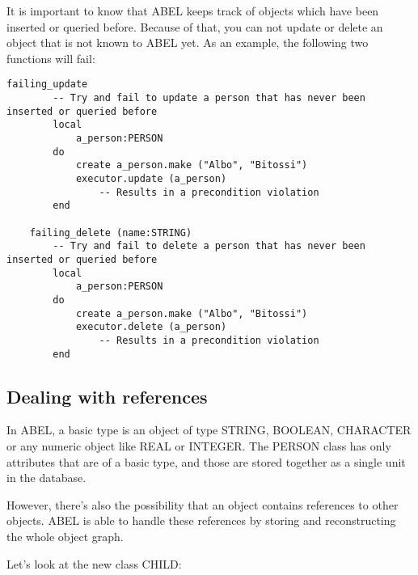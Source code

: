It is important to know that ABEL keeps track of objects which have been inserted or queried before.
Because of that, you can not update or delete an object that is not known to ABEL yet.
As an example, the following two functions will fail:

\begin{lstlisting}[language=OOSC2Eiffel, captionpos=b, caption={}, label={lst:simple_insert}]
	failing_update
		-- Try and fail to update a person that has never been inserted or queried before
		local
			a_person:PERSON
		do
			create a_person.make ("Albo", "Bitossi")
			executor.update (a_person)
				-- Results in a precondition violation
		end

	failing_delete (name:STRING)
		-- Try and fail to delete a person that has never been inserted or queried before
		local
			a_person:PERSON
		do
			create a_person.make ("Albo", "Bitossi")
			executor.delete (a_person) 
				-- Results in a precondition violation
		end
\end{lstlisting}




\subsection{Dealing with references}

In ABEL, a basic type is an object of type STRING, BOOLEAN, CHARACTER or any numeric object like REAL or INTEGER.
The PERSON class has only attributes that are of a basic type, and those are stored together as a single unit in the database.

However, there's also the possibility that an object contains references to other objects.
ABEL is able to handle these references by storing and reconstructing the whole object graph.

Let's look at the new class CHILD:

